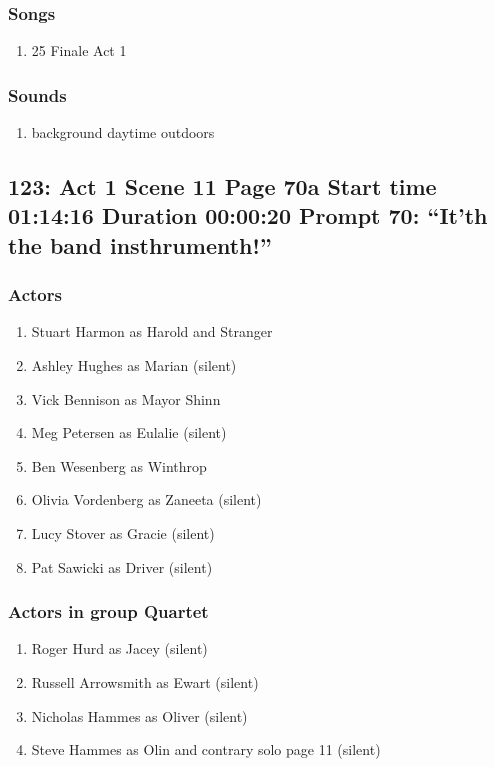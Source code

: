 \subsubsection{Songs}
\begin{enumerate}
\item 25 Finale Act 1
\end{enumerate}\subsubsection{Sounds}
\begin{enumerate}
\item background daytime outdoors
\end{enumerate}
\subsection{123: Act 1 Scene 11 Page 70a Start time 01:14:16 Duration 00:00:20 Prompt 70: ``It'th the band insthrumenth!''}

\subsubsection{Actors}
\begin{enumerate}
\item Stuart Harmon as Harold and Stranger
\item Ashley Hughes as Marian (silent)
\item Vick Bennison as Mayor Shinn
\item Meg Petersen as Eulalie (silent)
\item Ben Wesenberg as Winthrop
\item Olivia Vordenberg as Zaneeta (silent)
\item Lucy Stover as Gracie (silent)
\item Pat Sawicki as Driver (silent)
\end{enumerate}
\subsubsection{Actors in group Quartet}
\begin{enumerate}
\item Roger Hurd as Jacey (silent)
\item Russell Arrowsmith as Ewart (silent)
\item Nicholas Hammes as Oliver (silent)
\item Steve Hammes as Olin and contrary solo page 11 (silent)
\end{enumerate}
